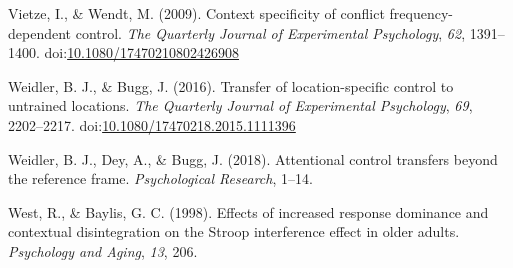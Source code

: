 \documentclass[english,,man,floatsintext]{apa6}
\begin{document}
\hypertarget{ref-vietze_context_2009}{}
Vietze, I., \& Wendt, M. (2009). Context specificity of conflict
frequency-dependent control. \emph{The Quarterly Journal of Experimental
Psychology}, \emph{62}, 1391--1400.
doi:\href{https://doi.org/10.1080/17470210802426908}{10.1080/17470210802426908}

\hypertarget{ref-weidler_transfer_2016}{}
Weidler, B. J., \& Bugg, J. (2016). Transfer of location-specific
control to untrained locations. \emph{The Quarterly Journal of
Experimental Psychology}, \emph{69}, 2202--2217.
doi:\href{https://doi.org/10.1080/17470218.2015.1111396}{10.1080/17470218.2015.1111396}

\hypertarget{ref-weidler_attentional_2018}{}
Weidler, B. J., Dey, A., \& Bugg, J. (2018). Attentional control
transfers beyond the reference frame. \emph{Psychological Research},
1--14.

\hypertarget{ref-west_effects_1998}{}
West, R., \& Baylis, G. C. (1998). Effects of increased response
dominance and contextual disintegration on the Stroop interference
effect in older adults. \emph{Psychology and Aging}, \emph{13}, 206.

\endgroup
\end{document}

